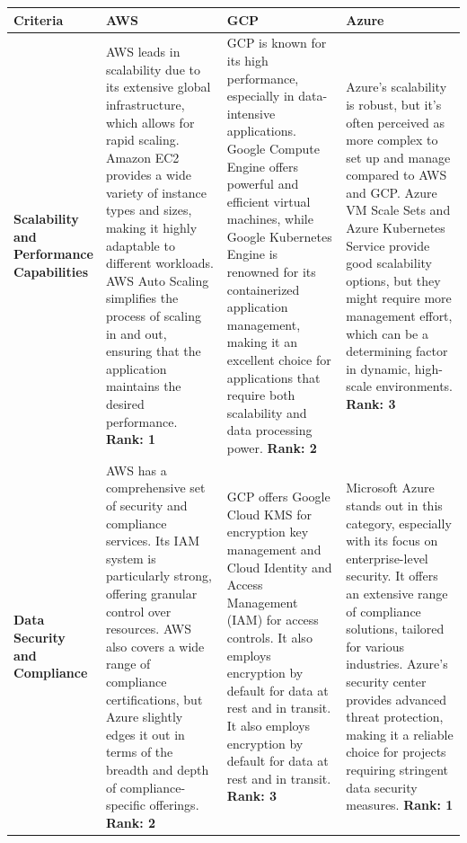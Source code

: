 \documentclass{article}
\begin{document}
\begin{table}[H]
    \centering
    \def\arraystretch{1.75}
    \begin{tabular}{|p{0.1\linewidth}| p{0.3\linewidth} | p{0.3\linewidth} | p{0.3\linewidth} |} \hline 
         \textbf{Criteria}&  \textbf{AWS}&  \textbf{GCP}& \textbf{Azure}\\ \hline 
         \textbf{Scalability and Performance Capabilities}&  \color{blue} AWS leads in scalability due to its extensive global infrastructure, which allows for rapid scaling. Amazon EC2 provides a wide variety of instance types and sizes, making it highly adaptable to different workloads. AWS Auto Scaling simplifies the process of scaling in and out, ensuring that the application maintains the desired performance.
        \textbf{Rank: 1}&  GCP is known for its high performance, especially in data-intensive applications. Google Compute Engine offers powerful and efficient virtual machines, while Google Kubernetes Engine is renowned for its containerized application management, making it an excellent choice for applications that require both scalability and data processing power.
        \textbf{Rank: 2}& Azure’s scalability is robust, but it's often perceived as more complex to set up and manage compared to AWS and GCP. Azure VM Scale Sets and Azure Kubernetes Service provide good scalability options, but they might require more management effort, which can be a determining factor in dynamic, high-scale environments.
        \textbf{Rank: 3}\\ \hline 
         \textbf{Data Security and Compliance}&  AWS has a comprehensive set of security and compliance services. Its IAM system is particularly strong, offering granular control over resources. AWS also covers a wide range of compliance certifications, but Azure slightly edges it out in terms of the breadth and depth of compliance-specific offerings.
        \textbf{Rank: 2}
        &  GCP offers Google Cloud KMS for encryption key management and Cloud Identity and Access Management (IAM) for access controls. It also employs encryption by default for data at rest and in transit.  It also employs encryption by default for data at rest and in transit.
        \textbf{Rank: 3}
        &  \color{blue} Microsoft Azure stands out in this category, especially with its focus on enterprise-level security. It offers an extensive range of compliance solutions, tailored for various industries. Azure’s security center provides advanced threat protection, making it a reliable choice for projects requiring stringent data security measures. \textbf{Rank: 1}\\ 
        

\end{tabular}
\end{table}
\end{document}
